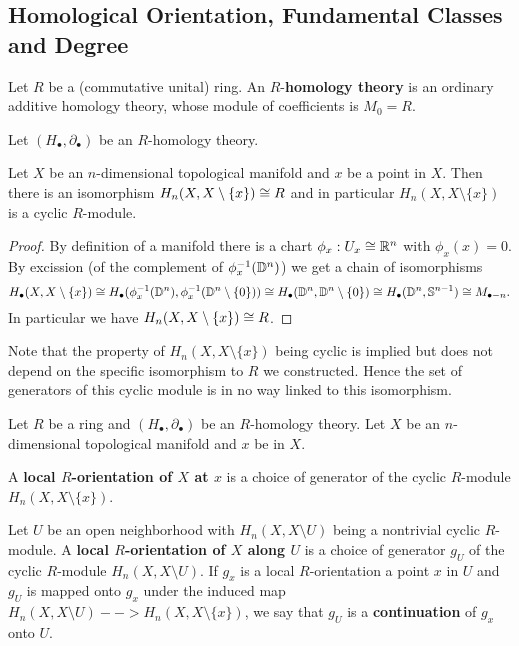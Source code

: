 
	\newpage
	\subsection{Homological Orientation, Fundamental Classes and Degree}

	\begin{definition}
		Let $R$ be a (commutative unital) ring. An $R$-\textbf{homology theory} is an ordinary additive homology theory, whose module of coefficients is $M_0 = R$.
	\end{definition}

	\begin{lemma}
		Let $(H_\bullet,\partial_\bullet)$ be an $R$-homology theory.

		Let $X$ be an $n$-dimensional topological manifold and $x$ be a point in $X$. Then there is an isomorphism $H_n(X,X\setminus \{x\}) \cong R$ and in particular $H_n(X,X\setminus \{x\})$ is a cyclic $R$-module.
	\end{lemma}
	\begin{proof}
		By definition of a manifold there is a chart $\phi_x: U_x \cong \mathbb{R}^n$ with $\phi_x(x) = 0$. By excission (of the complement of $\phi_x^{-1}(\mathbb{D}^n)$) we get a chain of isomorphisms
		\begin{equation*}
			H_\bullet(X,X\setminus\{x\}) \cong H_\bullet(\phi_x^{-1}(\mathbb{D}^n),\phi_x^{-1}(\mathbb{D}^n\setminus \{0\})) \cong H_\bullet(\mathbb{D}^n,\mathbb{D}^n\setminus \{0\}) \cong H_\bullet(\mathbb{D}^n,\mathbb{S}^{n-1}) \cong M_{\bullet-n}.
		\end{equation*}
		In particular we have $H_n(X,X\setminus\{x\}) \cong R$. 
	\end{proof}

	\begin{remark}
		Note that the property of $H_n(X,X\setminus \{x\})$ being cyclic is implied but does not depend on the specific isomorphism to $R$ we constructed. Hence the set of generators of this cyclic module is in no way linked to this isomorphism.
	\end{remark}

	\begin{definition}
		Let $R$ be a ring and $(H_\bullet, \partial_\bullet)$ be an $R$-homology theory. Let $X$ be an $n$-dimensional topological manifold and $x$ be in $X$. 

		A \textbf{local $R$-orientation of $X$ at $x$} is a choice of generator of the cyclic $R$-module $H_n(X,X\setminus\{x\})$.

		Let $U$ be an open neighborhood with $H_n(X,X\setminus U)$ being a nontrivial cyclic $R$-module. A \textbf{local $R$-orientation of $X$ along $U$} is a choice of generator $g_U$ of the cyclic $R$-module $H_n(X,X\setminus U)$. If $g_x$ is a local $R$-orientation a point $x$ in $U$ and $g_U$ is mapped onto $g_x$ under the induced map $H_n(X,X\setminus U) --> H_n(X,X\setminus \{x\})$, we say that $g_U$ is a \textbf{continuation} of $g_x$ onto $U$.
	\end{definition}

